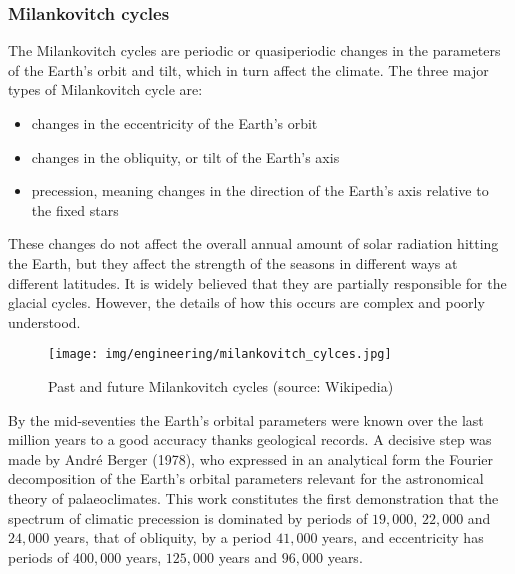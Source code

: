 	\subsubsection{Milankovitch cycles}
	The Milankovitch cycles are periodic or quasiperiodic changes in the parameters of the Earth's orbit and tilt, which in turn affect the climate. The three major types of Milankovitch cycle are:
	\begin{itemize}
		\item changes in the eccentricity of the Earth's orbit
		\item changes in the obliquity, or tilt of the Earth's axis
		\item precession, meaning changes in the direction of the Earth's axis relative
to the fixed stars
	\end{itemize}
These changes do not affect the overall annual amount of solar radiation hitting the Earth, but they affect the strength of the seasons in different ways at different latitudes. It is widely believed that they are partially responsible for the glacial cycles. However, the details of how this occurs are complex and poorly understood.
	\begin{figure}[H]
		\begin{center}
			\texttt{[image: img/engineering/milankovitch\_cylces.jpg]}
		\end{center}	
		\caption{Past and future Milankovitch cycles (source: Wikipedia)}
	\end{figure}
	\begin{tcolorbox}[title=Remark,colframe=black,arc=10pt]
	By the mid-seventies the Earth’s orbital parameters were known over the last million years to a good accuracy thanks geological records. A decisive step was made by  André Berger (1978), who expressed in an analytical form the Fourier decomposition of the Earth's orbital parameters relevant for the astronomical theory of palaeoclimates. This work constitutes the first demonstration that the spectrum of climatic precession is dominated by periods of $19,000$, $22,000$ and $24,000$ years, that of obliquity, by a period $41,000$ years, and eccentricity has periods of $400,000$ years, $125,000$ years and $96,000$ years. 
	\end{tcolorbox}
	

